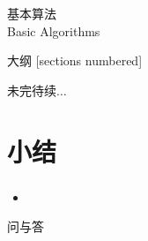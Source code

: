 \begin{standout}[第四章]
    基本算法\\
    Basic Algorithms
\end{standout}

\begin{frame}{大纲}
    [sections numbered]
    \tableofcontents
\end{frame}



\begin{standout}[]
    未完待续$\dots$
\end{standout}

\section{小结}

\begin{frame}
    \frametitle{\insertsectionhead}
    \begin{itemize}
        \item 
    \end{itemize}
\end{frame}

\begin{standout}[]
    问与答
\end{standout}
